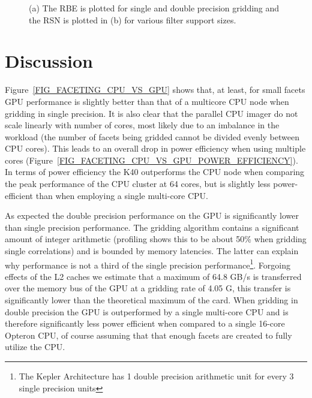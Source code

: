 \begin{figure}[ht!]
\begin{mdframed}
\begin{subfigure}[b]{0.95\textwidth}
    \caption{}
  \end{subfigure}

  \caption{(a) The RBE is plotted for single and double precision gridding and the RSN is plotted in (b) for various filter support sizes.}
  \label{FIG_RBE_SUP}
  \end{mdframed}
\end{figure}
\section{Discussion}
Figure~\ref{FIG_FACETING_CPU_VS_GPU} shows that, at least, for small facets GPU performance is slightly better than that of a multicore CPU node when gridding in
single precision. It is also clear that the parallel CPU imager do not scale linearly with number of cores, most likely due to an imbalance in the workload (the number of
facets being gridded cannot be divided evenly between CPU cores). This leads to an overall drop in power
efficiency when using multiple cores (Figure~\ref{FIG_FACETING_CPU_VS_GPU_POWER_EFFICIENCY}). In terms of power efficiency the K40 outperforms the CPU node when 
comparing the peak performance of the CPU cluster at 64 cores, but is slightly less power-efficient than when employing a single multi-core CPU.

As expected the double precision performance on the GPU is significantly lower than single precision performance. The gridding algorithm contains a significant amount of
integer arithmetic (profiling shows this to be about 50\% when gridding single correlations) and 
is bounded by memory latencies. The latter can explain why performance is not a third of the single precision
performance\footnote{The Kepler Architecture has 1 double precision arithmetic unit for every 3 single precision units}. 
Forgoing effects of the L2 caches we estimate that a maximum of 64.8 GB/s is transferred over the memory bus of the GPU at a gridding rate of 
4.05 G, this transfer is significantly lower than the theoretical maximum of the card. When gridding in double precision the GPU is outperformed 
by a single multi-core CPU and is therefore significantly less power efficient when compared to a single 16-core Opteron CPU, of course assuming that
that enough facets are created to fully utilize the CPU.

